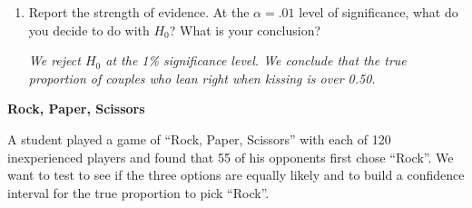 \begin{enumerate}
\begin{key} 
{\it $2 \times .001 = .002$  This is  very strong evidence against the
  null. }
\end{key}


\item Report the strength of evidence.  At the $\alpha = .01$ level of
  significance, what do you decide to do with $H_0$?  What is your
  conclusion?
\begin{students}
    \newpage
\end{students}

\begin{key} 
{\it We  reject $H_0$
  at the 1\% significance level.  We conclude that the true proportion of
  couples who lean right when kissing is over 0.50.}
\end{key}

\end{enumerate}

\begin{center}
  {\large \bf Rock, Paper, Scissors}
\end{center}

A student played a game of ``Rock, Paper, Scissors'' with each of 120
inexperienced players and found that 55 of his opponents first chose
``Rock''.  We want to test to see if the three options are equally
likely and to build a confidence interval for the true proportion to
pick ``Rock''.

